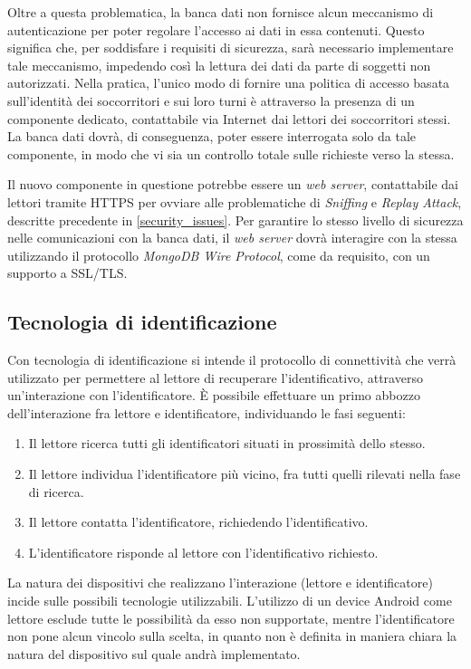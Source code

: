 \documentclass[a4paper,12pt]{report}
\begin{document}
Oltre a questa problematica, la banca dati non fornisce alcun meccanismo di autenticazione per poter regolare l'accesso ai dati in essa contenuti. Questo significa che, per soddisfare i requisiti di sicurezza, sarà necessario implementare tale meccanismo, impedendo così la lettura dei dati da parte di soggetti non autorizzati. Nella pratica, l'unico modo di fornire una politica di accesso basata sull'identità dei soccorritori e sui loro turni è attraverso la presenza di un componente dedicato, contattabile via Internet dai lettori dei soccorritori stessi. La banca dati dovrà, di conseguenza, poter essere interrogata solo da tale componente, in modo che vi sia un controllo totale sulle richieste verso la stessa. 

Il nuovo componente in questione potrebbe essere un \emph{web server}, contattabile dai lettori tramite HTTPS per ovviare alle problematiche di \emph{Sniffing} e \emph{Replay Attack}, descritte precedente in \autoref{security_issues}. Per garantire lo stesso livello di sicurezza nelle comunicazioni con la banca dati, il \emph{web server} dovrà interagire con la stessa utilizzando il protocollo \emph{MongoDB Wire Protocol}, come da requisito, con un supporto a SSL/TLS. 

\subsection{Tecnologia di identificazione} \label{tec-id}
Con tecnologia di identificazione si intende il protocollo di connettività che verrà utilizzato per permettere al lettore di recuperare l'identificativo, attraverso un'interazione con l'identificatore. È possibile effettuare un primo abbozzo dell'interazione fra lettore e identificatore, individuando le fasi seguenti:
\begin{enumerate}
	\item Il lettore ricerca tutti gli identificatori situati in prossimità dello stesso.
	\item Il lettore individua l'identificatore più vicino, fra tutti quelli rilevati nella fase di ricerca.
	\item Il lettore contatta l'identificatore, richiedendo l'identificativo.
	\item L'identificatore risponde al lettore con l'identificativo richiesto.
\end{enumerate}
La natura dei dispositivi che realizzano l'interazione (lettore e identificatore) incide sulle possibili tecnologie utilizzabili. L'utilizzo di un device Android come lettore esclude tutte le possibilità da esso non supportate, mentre l'identificatore non pone alcun vincolo sulla scelta, in quanto non è definita in maniera chiara la natura del dispositivo sul quale andrà implementato.
\end{document}
